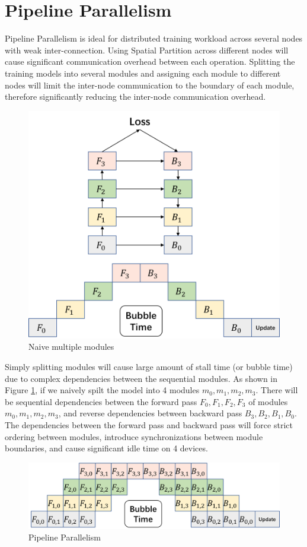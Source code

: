 \documentclass[sigplan, nonacm]{acmart}\settopmatter{printfolios=true,printccs=false,printacmref=false}
\begin{document}
 \section{Pipeline Parallelism} \label{pipelineparallism}
 Pipeline Parallelism is ideal for distributed training workload across several nodes with weak inter-connection. Using Spatial Partition across different nodes will cause significant communication overhead between each operation. Splitting the training models into several modules and assigning each module to different nodes will limit the inter-node communication to the boundary of each module, therefore significantly reducing the inter-node communication overhead.\par
 \begin{figure}[htbp]
  \centering
  \includegraphics[scale=0.4]{NormalPipeline}
  \caption{Naive multiple modules}
  \label{fig:multiplemodule}
\end{figure}
 Simply splitting modules will cause large amount of stall time (or bubble time) due to complex dependencies between the sequential modules. As shown in Figure \ref{fig:multiplemodule}, if we naively spilt the model into 4 modules $m_0,m_1,m_2,m_3$. There will be sequential dependencies between the forward pass $F_0, F_1, F_2, F_3$ of modules $m_0,m_1,m_2,m_3$, and reverse dependencies between backward pass $B_3, B_2, B_1, B_0$. The dependencies between the forward pass and backward pass will force strict ordering between modules, introduce synchronizations between module boundaries, and cause significant idle time on 4 devices. \par
 \begin{figure}[htbp]
  \centering
  \includegraphics[scale=0.45]{stackedpipeline}
  \caption{Pipeline Parallelism}
  \label{fig:stackedpipeline}
\end{figure}
\end{document}
